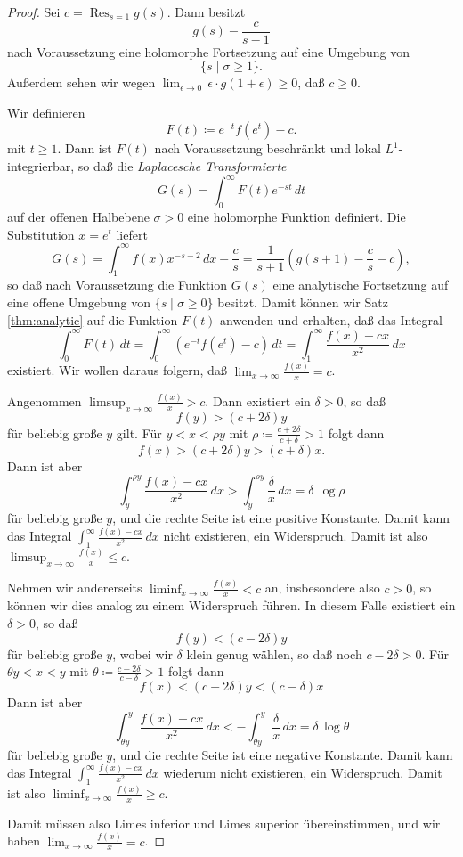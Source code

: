 \documentclass[a4paper,twoside,openright]{report}
\theoremstyle{definition}
\theoremstyle{remark}
\DeclareMathOperator{\Res}{Res}
\begin{document}
\begin{proof}
  Sei $c = \Res_{s = 1} g(s)$. Dann besitzt
  \[
    g(s) - \frac c{s - 1}
  \]
  nach Voraussetzung
  eine holomorphe Fortsetzung auf eine Umgebung von
  \[
    \{s \mid \sigma \ge 1\}.
  \]
  Außerdem sehen wir wegen $\lim_{\epsilon \to 0} \, \epsilon \cdot g(1 + \epsilon) \ge 0$, 
  daß $c \ge 0$.
  
  Wir definieren
  \[
    F(t) \coloneqq e^{-t} f(e^t) - c.
  \]
  mit $t \ge 1$. Dann ist $F(t)$ nach Voraussetzung beschränkt und
  lokal $L^1$-integrier\-bar, so daß die
  \emph{Laplacesche Transformierte}
  \[
    G(s) = \int_0^\infty F(t) e^{-s t} \, dt
  \]
  auf der offenen Halbebene $\sigma > 0$ eine holomorphe Funktion definiert.
  Die Substitution $x = e^t$ liefert
  \[
    G(s) = \int_1^\infty f(x) x^{-s - 2} \, dx - \frac c s
    = \frac{1}{s + 1}\left(g(s + 1) - \frac c s - c\right),
  \] 
  so daß nach Voraussetzung die Funktion $G(s)$ eine analytische Fortsetzung
  auf eine offene Umgebung von $\{s \mid \sigma \ge 0\}$ besitzt. Damit können
  wir Satz \ref{thm:analytic} auf die Funktion $F(t)$ anwenden und erhalten, daß
  das Integral
  \[
    \int_0^\infty F(t) \, dt = \int_0^\infty (e^{-t} f(e^t) - c) \, dt
    = \int_1^\infty \frac{f(x) - cx}{x^2} \, dx
  \]
  existiert. Wir wollen daraus folgern, daß $\lim_{x \to \infty} \frac{f(x)}{x} = c$.
  
  Angenommen $\limsup_{x \to \infty} \frac{f(x)}{x} > c$. Dann existiert ein
  $\delta > 0$, so daß
  \[
    f(y) > (c + 2 \delta) y
  \]
  für beliebig große $y$ gilt. Für $y < x < \rho y$ mit $\rho \coloneqq \frac{c + 2\delta}{c + \delta} > 1$
  folgt dann
  \[
    f(x) > (c + 2 \delta) y > (c + \delta) x.
  \]
  Dann ist aber
  \[
    \int_y^{\rho y} \frac{f(x) - cx}{x^2} \, dx > \int_y^{\rho y} \frac \delta x \, dx
    = \delta \, \log \rho
  \]
  für beliebig große $y$,
  und die rechte Seite ist eine positive Konstante. Damit kann das Integral
  $\int_1^\infty \frac{f(x) - cx}{x^2} \, dx$ nicht existieren, ein Widerspruch.
  Damit ist also $\limsup_{x \to \infty} \frac{f(x)}{x} \leq c$.
  
  Nehmen wir andererseits $\liminf_{x \to \infty} \frac{f(x)}{x} < c$ an, insbesondere
  also $c > 0$, so
  können wir dies analog zu einem Widerspruch führen. In diesem Falle existiert
  ein $\delta > 0$, so daß
  \[
    f(y) < (c - 2 \delta) y
  \]
  für beliebig große $y$, wobei wir $\delta$ klein genug wählen, so daß
  noch $c - 2 \delta > 0$. Für $\theta y < x < y$ mit $\theta \coloneqq \frac{c - 2 \delta}{c - \delta} > 1$
  folgt dann
  \[
    f(x) < (c - 2 \delta) y < (c - \delta) x
  \] 
  Dann ist aber
  \[
    \int_{\theta y}^y \frac{f(x) - cx}{x^2} \, dx < - \int_{\theta y}^y \frac \delta x \, dx
    = \delta \, \log \theta
  \] 
  für beliebig große $y$,
  und die rechte Seite ist eine negative Konstante. Damit kann das Integral
  $\int_1^\infty \frac{f(x) - cx}{x^2} \, dx$ wiederum nicht existieren, ein Widerspruch.
  Damit ist also $\liminf_{x \to \infty} \frac{f(x)}{x} \geq c$.
  
  Damit müssen also Limes inferior und Limes superior übereinstimmen, und wir
  haben $\lim_{x \to \infty} \frac{f(x)} x = c$.
\end{proof}
\end{document}
